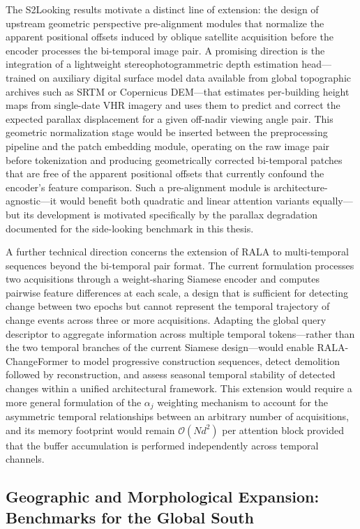 The S2Looking results motivate a distinct line of extension: the design of
upstream geometric perspective pre-alignment modules that normalize the apparent
positional offsets induced by oblique satellite acquisition before the encoder
processes the bi-temporal image pair. A promising direction is the integration
of a lightweight stereophotogrammetric depth estimation head---trained on
auxiliary digital surface model data available from global topographic archives
such as SRTM or Copernicus DEM---that estimates per-building height maps from
single-date VHR imagery and uses them to predict and correct the expected
parallax displacement for a given off-nadir viewing angle pair. This geometric
normalization stage would be inserted between the preprocessing pipeline and the
patch embedding module, operating on the raw image pair before tokenization and
producing geometrically corrected bi-temporal patches that are free of the
apparent positional offsets that currently confound the encoder's feature
comparison. Such a pre-alignment module is architecture-agnostic---it would
benefit both quadratic and linear attention variants equally---but its
development is motivated specifically by the parallax degradation documented
for the side-looking benchmark in this thesis.

A further technical direction concerns the extension of RALA to multi-temporal
sequences beyond the bi-temporal pair format. The current formulation processes
two acquisitions through a weight-sharing Siamese encoder and computes pairwise
feature differences at each scale, a design that is sufficient for detecting
change between two epochs but cannot represent the temporal trajectory of change
events across three or more acquisitions. Adapting the global query descriptor
to aggregate information across multiple temporal tokens---rather than the two
temporal branches of the current Siamese design---would enable RALA-ChangeFormer
to model progressive construction sequences, detect demolition followed by
reconstruction, and assess seasonal temporal stability of detected changes within
a unified architectural framework. This extension would require a more general
formulation of the $\alpha_j$ weighting mechanism to account for the asymmetric
temporal relationships between an arbitrary number of acquisitions, and its
memory footprint would remain $\mathcal{O}(N d^2)$ per attention block provided
that the buffer accumulation is performed independently across temporal channels.

\subsection*{Geographic and Morphological Expansion: Benchmarks for the
Global South}

